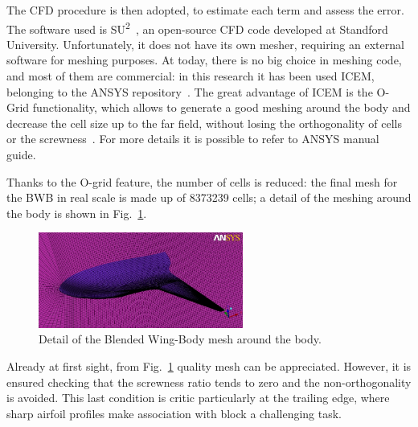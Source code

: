 The CFD procedure is then adopted, to estimate each term and assess the error.
The software used is SU\textsuperscript{2}~\cite{bib:su2_main_paper, bib:su2_journal}, an open-source CFD code developed at Standford University. 
Unfortunately, it does not have its own mesher, requiring an external software for meshing purposes. 
At today, there is no big choice in meshing code, and most of them are commercial: in this research it has been used ICEM, belonging to the ANSYS repository~\cite{bib:ansys_pack}. 
The great advantage of ICEM is the O-Grid functionality, which allows to generate a good meshing around the body and decrease the cell size up to the far field, without losing the orthogonality of cells or the screwness~\cite{bib:cdn_notes}. 
For more details it is possible to refer to ANSYS manual guide.

Thanks to the O-grid feature, the number of cells is reduced: the final mesh for the BWB in real scale is made up of 8373239 cells; a detail of the meshing around the body is shown in Fig.~\ref{fig:bwb_mesh_detail}.
\begin{figure}[!h]
	\centering
	\includegraphics[keepaspectratio, width=0.6\textwidth]{images/chap4/bwb_mesh_detail.jpg}
	\caption{Detail of the Blended Wing-Body mesh around the body.}
	\label{fig:bwb_mesh_detail}
\end{figure}
Already at first sight, from Fig.~\ref{fig:bwb_mesh_detail} quality mesh can be appreciated. 
However, it is ensured checking that the screwness ratio tends to zero and the non-orthogonality is avoided. 
This last condition is critic particularly at the trailing edge, where sharp airfoil profiles make association with block a challenging task. 

